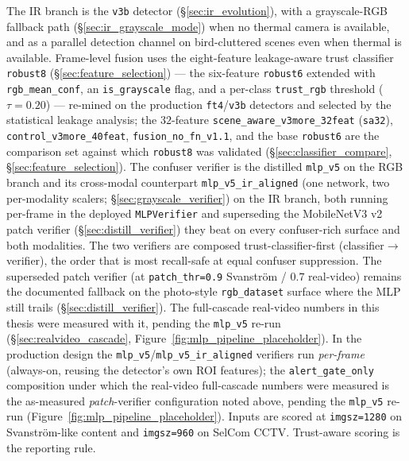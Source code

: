 The IR branch is the \texttt{v3b} detector (\S\ref{sec:ir_evolution}), with a grayscale-RGB fallback path (\S\ref{sec:ir_grayscale_mode}) when no thermal camera is available, and as a parallel detection channel on bird-cluttered scenes even when thermal is available. Frame-level fusion uses the eight-feature leakage-aware trust classifier \texttt{robust8} (\S\ref{sec:feature_selection}) --- the six-feature \texttt{robust6} extended with \texttt{rgb\_mean\_conf}, an \texttt{is\_grayscale} flag, and a per-class \texttt{trust\_rgb} threshold ($\tau{=}0.20$) --- re-mined on the production \texttt{ft4}/\texttt{v3b} detectors and selected by the statistical leakage analysis; the $32$-feature \texttt{scene\_aware\_v3more\_32feat} (\texttt{sa32}), \texttt{control\_v3more\_40feat}, \texttt{fusion\_no\_fn\_v1.1}, and the base \texttt{robust6} are the comparison set against which \texttt{robust8} was validated (\S\ref{sec:classifier_compare}, \S\ref{sec:feature_selection}). The confuser verifier is the distilled \texttt{mlp\_v5} on the RGB branch and its cross-modal counterpart \texttt{mlp\_v5\_ir\_aligned} (one network, two per-modality scalers; \S\ref{sec:grayscale_verifier}) on the IR branch, both running per-frame in the deployed \texttt{MLPVerifier} and superseding the MobileNetV3 v2 patch verifier (\S\ref{sec:distill_verifier}) they beat on every confuser-rich surface and both modalities. The two verifiers are composed trust-classifier-first (classifier$\to$verifier), the order that is most recall-safe at equal confuser suppression. The superseded patch verifier (at \texttt{patch\_thr=0.9} Svanstr\"om / $0.7$ real-video) remains the documented fallback on the photo-style \texttt{rgb\_dataset} surface where the MLP still trails (\S\ref{sec:distill_verifier}). The full-cascade real-video numbers in this thesis were measured with it, pending the \texttt{mlp\_v5} re-run (\S\ref{sec:realvideo_cascade}, Figure~\ref{fig:mlp_pipeline_placeholder}). In the production design the \texttt{mlp\_v5}/\texttt{mlp\_v5\_ir\_aligned} verifiers run \emph{per-frame} (always-on, reusing the detector's own ROI features); the \texttt{alert\_gate\_only} composition under which the real-video full-cascade numbers were measured is the as-measured \emph{patch}-verifier configuration noted above, pending the \texttt{mlp\_v5} re-run (Figure~\ref{fig:mlp_pipeline_placeholder}). Inputs are scored at \texttt{imgsz=1280} on Svanstr\"om-like content and \texttt{imgsz=960} on SelCom CCTV. Trust-aware scoring is the reporting rule.

